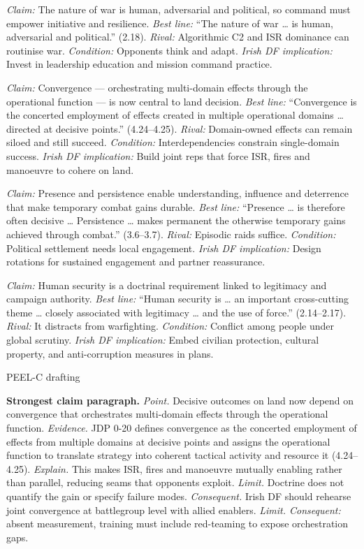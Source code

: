 \textit{Claim:} The nature of war is human, adversarial and political, so command must empower initiative and resilience. \textit{Best line:} “The nature of war … is human, adversarial and political.” (2.18). \textit{Rival:} Algorithmic C2 and ISR dominance can routinise war. \textit{Condition:} Opponents think and adapt. \textit{Irish DF implication:} Invest in leadership education and mission command practice.

\textit{Claim:} Convergence — orchestrating multi-domain effects through the operational function — is now central to land decision. \textit{Best line:} “Convergence is the concerted employment of effects created in multiple operational domains … directed at decisive points.” (4.24–4.25). \textit{Rival:} Domain-owned effects can remain siloed and still succeed. \textit{Condition:} Interdependencies constrain single-domain success. \textit{Irish DF implication:} Build joint reps that force ISR, fires and manoeuvre to cohere on land.

\textit{Claim:} Presence and persistence enable understanding, influence and deterrence that make temporary combat gains durable. \textit{Best line:} “Presence … is therefore often decisive … Persistence … makes permanent the otherwise temporary gains achieved through combat.” (3.6–3.7). \textit{Rival:} Episodic raids suffice. \textit{Condition:} Political settlement needs local engagement. \textit{Irish DF implication:} Design rotations for sustained engagement and partner reassurance.

\textit{Claim:} Human security is a doctrinal requirement linked to legitimacy and campaign authority. \textit{Best line:} “Human security is … an important cross-cutting theme … closely associated with legitimacy … and the use of force.” (2.14–2.17). \textit{Rival:} It distracts from warfighting. \textit{Condition:} Conflict among people under global scrutiny. \textit{Irish DF implication:} Embed civilian protection, cultural property, and anti-corruption measures in plans.

PEEL-C drafting

\textbf{Strongest claim paragraph.}
\textit{Point.} Decisive outcomes on land now depend on convergence that orchestrates multi-domain effects through the operational function. \textit{Evidence.} JDP 0-20 defines convergence as the concerted employment of effects from multiple domains at decisive points and assigns the operational function to translate strategy into coherent tactical activity and resource it (4.24–4.25). \textit{Explain.} This makes ISR, fires and manoeuvre mutually enabling rather than parallel, reducing seams that opponents exploit. \textit{Limit.} Doctrine does not quantify the gain or specify failure modes. \textit{Consequent.} Irish DF should rehearse joint convergence at battlegroup level with allied enablers. \textit{Limit. Consequent:} absent measurement, training must include red-teaming to expose orchestration gaps.

